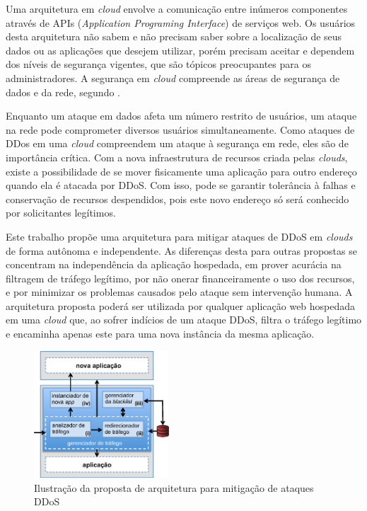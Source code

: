 

Uma arquitetura em \emph{cloud} envolve a comunicação entre inúmeros componentes através de APIs (\emph{Application Programing Interface}) de serviços web. Os usuários desta arquitetura não sabem e não precisam saber sobre a localização de seus dados ou as aplicações que desejem utilizar, porém precisam aceitar e dependem  dos níveis de segurança vigentes, que são tópicos preocupantes para os administradores.
A segurança em \emph{cloud} compreende as áreas de segurança de dados e da rede, segundo \cite{Dhage:2011:IDS:1980022.1980076}. 

Enquanto um ataque em dados afeta um número restrito de usuários, um ataque na rede pode comprometer diversos usuários simultaneamente. Como ataques de DDos em uma \emph{cloud} compreendem um ataque à segurança em rede, eles são de importância crítica.  
%
Com a nova infraestrutura de recursos criada pelas \emph{clouds}, existe a possibilidade de se mover fisicamente uma aplicação para outro endereço quando ela é atacada por DDoS. Com isso, pode se garantir tolerância à falhas e conservação de recursos despendidos, pois este novo endereço só será conhecido por solicitantes legítimos.

Este trabalho propõe uma arquitetura para mitigar ataques de DDoS em \emph{clouds} de forma autônoma e independente. As diferenças desta para outras propostas se concentram na independência da aplicação hospedada, em prover acurácia na filtragem de tráfego legítimo, por não onerar financeiramente o uso dos recursos, e por minimizar os problemas causados pelo ataque sem intervenção humana.
%
A arquitetura proposta poderá ser utilizada por qualquer aplicação web hospedada em uma \emph{cloud} que, ao sofrer indícios de um ataque DDoS, filtra o tráfego legítimo e encaminha apenas este para uma nova instância da mesma aplicação. 

\begin{figure}[h!]
\centering
\includegraphics[width=0.45\textwidth]{images/arq.eps}
\caption{Ilustração da proposta de arquitetura para mitigação de ataques DDoS}
\label{fig:arq}
\end{figure}

